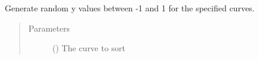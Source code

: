 \documentclass[letterpaper,10pt,english]{sphinxmanual}
\begin{document}

\begin{fulllineitems}
\label{\detokenize{pydv:pydvpy.random}}
Generate random y values between -1 and 1 for the specified curves.

\begin{sphinxVerbatim}[commandchars=\\\{\}]
   
\end{sphinxVerbatim}

\begin{sphinxVerbatim}[commandchars=\\\{\}]
\end{sphinxVerbatim}
\begin{quote}\begin{description}
\item[{Parameters}] \leavevmode
{} ({\hyperref[\detokenize{pydv:curve.Curve}]{}}) \textendash{} The curve to sort

\end{description}\end{quote}

\end{fulllineitems}

\end{document}
